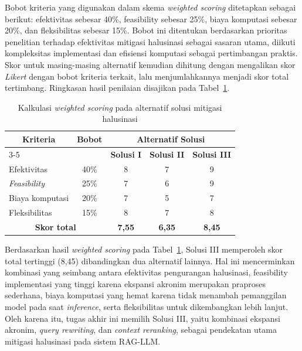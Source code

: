Bobot kriteria yang digunakan dalam skema \textit{weighted scoring} ditetapkan sebagai berikut: efektivitas sebesar 40\%, feasibility sebesar 25\%, biaya komputasi sebesar 20\%, dan fleksibilitas sebesar 15\%. Bobot ini ditentukan berdasarkan prioritas penelitian terhadap efektivitas mitigasi halusinasi sebagai sasaran utama, diikuti kompleksitas implementasi dan efisiensi komputasi sebagai pertimbangan praktis. Skor untuk masing-masing alternatif kemudian dihitung dengan mengalikan skor \textit{Likert} dengan bobot kriteria terkait, lalu menjumlahkannya menjadi skor total tertimbang. Ringkasan hasil penilaian disajikan pada Tabel~\ref{tbl:weighted_scoring_solusi}.

\begin{table}[H]
  \centering
  \caption{Kalkulasi \textit{weighted scoring} pada alternatif solusi mitigasi halusinasi}
  \label{tbl:weighted_scoring_solusi}
  \begin{tabular}{|p{3cm}|c|c|c|c|}
    \hline
    \multicolumn{1}{|c|}{\textbf{Kriteria}} &
    \textbf{Bobot} &
    \multicolumn{3}{c|}{\textbf{Alternatif Solusi}} \\
    \cline{3-5}
    & &
    \textbf{Solusi I} &
    \textbf{Solusi II} &
    \textbf{Solusi III} \\
    \hline

    Efektivitas & 40\% &
    8 & 7 & 9 \\
    \hline

    \textit{Feasibility} & 25\% &
    7 & 6 & 9 \\
    \hline

    Biaya komputasi & 20\% &
    7 & 5 & 7 \\
    \hline

    Fleksibilitas & 15\% &
    8 & 7 & 8 \\
    \hline

    \multicolumn{2}{|c|}{\textbf{Skor total}} &
    \textbf{7,55} &
    \textbf{6,35} &
    \textbf{8,45} \\
    \hline
  \end{tabular}
\end{table}



Berdasarkan hasil \textit{weighted scoring} pada Tabel~\ref{tbl:weighted_scoring_solusi}, Solusi III memperoleh skor total tertinggi (8,45) dibandingkan dua alternatif lainnya. Hal ini mencerminkan kombinasi yang seimbang antara efektivitas pengurangan halusinasi, feasibility implementasi yang tinggi karena ekspansi akronim merupakan praproses sederhana, biaya komputasi yang hemat karena tidak menambah pemanggilan model pada saat \textit{inference}, serta fleksibilitas untuk dikembangkan lebih lanjut. Oleh karena itu, tugas akhir ini memilih Solusi III, yaitu kombinasi ekspansi akronim, \textit{query rewriting}, dan \textit{context reranking}, sebagai pendekatan utama mitigasi halusinasi pada sistem RAG-LLM.


